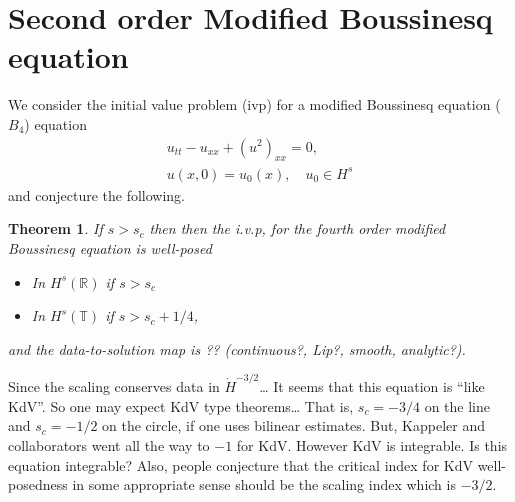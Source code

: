 \documentclass[12pt,reqno]{amsart}
\numberwithin{equation}{section}  %
\numberwithin{figure}{section}
\newcommand{\rr}{\mathbb{R}}
\newcommand{\ci}{\mathbb{T}}
\theoremstyle{plain}
\newtheorem{theorem}{Theorem}
\theoremstyle{definition}
\theoremstyle{remark}
\begin{document}
\section{Second order Modified Boussinesq  equation}
\label{sec:intro}
We consider the initial value problem (ivp) for a modified Boussinesq
equation ($B_4$) equation 
\begin{gather}
  u_{tt} - u_{xx} + (u^2)_{xx} = 0,
  \label{eqn:mb}
  \\
  u(x,0) = u_{0}(x), \quad u_{0} \in H^{s}
  \label{eqn:mb-init-data}
\end{gather}
and conjecture the following.
%
%
%
%
%
%
%
%
\begin{theorem}
  If $s>s_c$ then then the  i.v.p, for the fourth order modified
  Boussinesq  equation is well-posed
  \begin{itemize}
    \item In $H^s(\rr)$ if $s > s_c$
    \item In $H^{s}(\ci)$ if $s > s_c + 1/4$,
  \end{itemize}
  and the data-to-solution map is ?? (continuous?, Lip?, smooth, analytic?). 
  \label{thm:wp}
\end{theorem}
%
%
%
%
%
Since the scaling conserves data in $\dot{H}^{-3/2}$\ldots
It seems that this equation is ``like KdV''.
So one may expect KdV type theorems\ldots
That is, $s_c=-3/4$ on the line and $s_c=-1/2$ on the circle,
if one uses bilinear estimates.
But, Kappeler and collaborators went all the way to $-1$ for KdV.
However KdV is integrable. Is this equation integrable?
Also, people conjecture that the critical index for KdV well-posedness 
in some appropriate sense should be the scaling index which is  $-3/2$.

\newpage
\appendix
\end{document}
